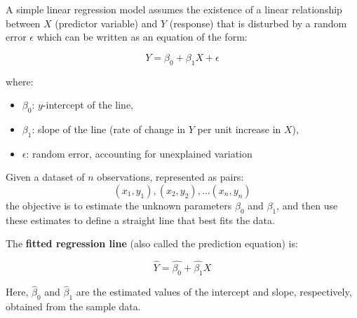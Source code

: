 \documentclass[twoside]{book}
\begin{document}
A simple linear regression model assumes the existence of a linear relationship between $X$ (predictor variable) and $Y$ (response) that is disturbed by a random error $\epsilon$ which can be written as an equation of the form:

\begin{textbox}
\[
Y = \beta_0 + \beta_1 X + \epsilon
\]
\end{textbox}

where:
\begin{itemize}
    \item \( \beta_0 \): $y$-intercept of the line,
    \item \( \beta_1 \): slope of the line (rate of change in \( Y \) per unit increase in \( X \)),
    \item \( \epsilon \): random error, accounting for unexplained variation
\end{itemize}

Given a dataset of \( n \) observations, represented as pairs:
$$(x_1,y_1), (x_2, y_2), \dots (x_n, y_n)$$
the objective is to estimate the unknown parameters \( \beta_0 \) and \( \beta_1 \), and then use these estimates to define a straight line that best fits the data.

The \textbf{fitted regression line} (also called the prediction equation) is:
\begin{textbox}
    $$\hat{Y} = \hat{\beta_0} + \hat{\beta_1}X$$
\end{textbox}
Here, \( \hat{\beta}_0 \) and \( \hat{\beta}_1 \) are the estimated values of the intercept and slope, respectively, obtained from the sample data.

\begin{center}
\end{center}
\end{document}
